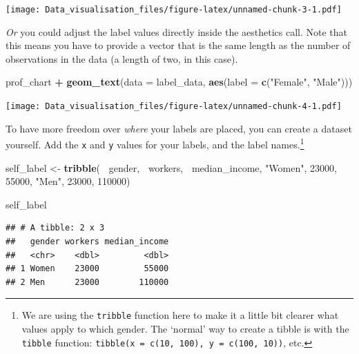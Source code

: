 \documentclass[]{book}
\newenvironment{Shaded}{\begin{snugshade}}{\end{snugshade}}
\newcommand{\DataTypeTok}[1]{\textcolor[rgb]{0.13,0.29,0.53}{#1}}
\newcommand{\DecValTok}[1]{\textcolor[rgb]{0.00,0.00,0.81}{#1}}
\newcommand{\KeywordTok}[1]{\textcolor[rgb]{0.13,0.29,0.53}{\textbf{#1}}}
\newcommand{\NormalTok}[1]{#1}
\newcommand{\OperatorTok}[1]{\textcolor[rgb]{0.81,0.36,0.00}{\textbf{#1}}}
\newcommand{\StringTok}[1]{\textcolor[rgb]{0.31,0.60,0.02}{#1}}
\let\rmarkdownfootnote\footnote%
\def\footnote{\protect\rmarkdownfootnote}
\begin{document}
\texttt{[image: Data\_visualisation\_files/figure-latex/unnamed-chunk-3-1.pdf]}

\emph{Or} you could adjust the label values directly inside the aesthetics call. Note that this means you have to provide a vector that is the same length as the number of observations in the data (a length of two, in this case).

\begin{Shaded}
\begin{Highlighting}[]
\NormalTok{prof_chart }\OperatorTok{+}
\StringTok{  }\KeywordTok{geom_text}\NormalTok{(}\DataTypeTok{data =}\NormalTok{ label_data,}
            \KeywordTok{aes}\NormalTok{(}\DataTypeTok{label =} \KeywordTok{c}\NormalTok{(}\StringTok{"Female"}\NormalTok{, }\StringTok{"Male"}\NormalTok{)))}
\end{Highlighting}
\end{Shaded}

\texttt{[image: Data\_visualisation\_files/figure-latex/unnamed-chunk-4-1.pdf]}

To have more freedom over \emph{where} your labels are placed, you can create a dataset yourself. Add the \texttt{x} and \texttt{y} values for your labels, and the label names.\footnote{We are using the \texttt{tribble} function here to make it a little bit clearer what values apply to which gender. The `normal' way to create a tibble is with the \texttt{tibble} function: \texttt{tibble(x\ =\ c(10,\ 100),\ y\ =\ c(100,\ 10))}, etc.}

\begin{Shaded}
\begin{Highlighting}[]
\NormalTok{self_label <-}\StringTok{ }\KeywordTok{tribble}\NormalTok{(}
  \OperatorTok{~}\NormalTok{gender, }\OperatorTok{~}\NormalTok{workers,   }\OperatorTok{~}\NormalTok{median_income,}
  \StringTok{"Women"}\NormalTok{,    }\DecValTok{23000}\NormalTok{,            }\DecValTok{55000}\NormalTok{,}
  \StringTok{"Men"}\NormalTok{,      }\DecValTok{23000}\NormalTok{,           }\DecValTok{110000}\NormalTok{)}


\NormalTok{self_label}
\end{Highlighting}
\end{Shaded}

\begin{verbatim}
## # A tibble: 2 x 3
##   gender workers median_income
##   <chr>    <dbl>         <dbl>
## 1 Women    23000         55000
## 2 Men      23000        110000
\end{verbatim}
\end{document}
